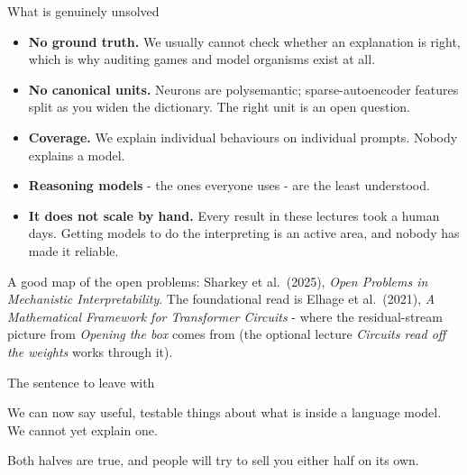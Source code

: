\documentclass[aspectratio=169]{beamer}
\begin{document}
\begin{frame}{What is genuinely unsolved}
  \vspace{0.7em}
  \begin{itemize}
    \item \textbf{No ground truth.} We usually cannot check whether an explanation is right,
      which is why auditing games and model organisms exist at all.
    \item \textbf{No canonical units.} Neurons are polysemantic; sparse-autoencoder features
      split as you widen the dictionary. The right unit is an open question.
    \item \textbf{Coverage.} We explain individual behaviours on individual prompts. Nobody
      explains a model.
    \item \textbf{Reasoning models} - the ones everyone uses - are the least understood.
    \item \textbf{It does not scale by hand.} Every result in these lectures took a human days.
      Getting models to do the interpreting is an active area, and nobody has made it reliable.
  \end{itemize}

  \vspace{0.6em}
  {\footnotesize A good map of the open problems: Sharkey et al.\ (2025), \emph{Open Problems in
  Mechanistic Interpretability}. The foundational read is Elhage et al.\ (2021),
  \emph{A Mathematical Framework for Transformer Circuits} - where the residual-stream picture
  from \emph{Opening the box} comes from (the optional lecture \emph{Circuits read off the weights} works
  through it).}
\end{frame}

\begin{frame}{The sentence to leave with}
  \vspace{1.6em}
  \begin{center}
  \begin{tcolorbox}[colback=armblue!8, colframe=armblue, boxrule=0.9pt, arc=3pt,
                    width=0.9\textwidth]
    \centering\large
    We can now say useful, testable things about what is inside a language model.\\[0.7em]
    We cannot yet explain one.
  \end{tcolorbox}
  \end{center}

  \vspace{1.6em}
  \begin{center}
    Both halves are true, and people will try to sell you either half on its own.
  \end{center}
\end{frame}
\end{document}
